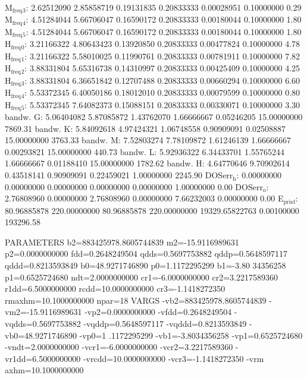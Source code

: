 \documentclass[11pt]{article}
\begin{document}
M\(_{\text{freq}}\)\(_{\text{3}}\):   2.62512090   2.85858719   0.19131835   0.20833333   0.00028951   0.10000000         0.29
M\(_{\text{freq}}\)\(_{\text{4}}\):   4.51284044   5.66706047   0.16590172   0.20833333   0.00180044   0.10000000         1.80
M\(_{\text{freq}}\)\(_{\text{5}}\):   4.51284044   5.66706047   0.16590172   0.20833333   0.00180044   0.10000000         1.80
H\(_{\text{freq}}\)\(_{\text{0}}\):   3.21166322   4.80643423   0.13920850   0.20833333   0.00477824   0.10000000         4.78
H\(_{\text{freq}}\)\(_{\text{1}}\):   3.21166322   5.58010025   0.11990761   0.20833333   0.00781911   0.10000000         7.82
H\(_{\text{freq}}\)\(_{\text{2}}\):   3.88331804   5.65316738   0.14310997   0.20833333   0.00425409   0.10000000         4.25
H\(_{\text{freq}}\)\(_{\text{3}}\):   3.88331804   6.36651842   0.12707488   0.20833333   0.00660294   0.10000000         6.60
H\(_{\text{freq}}\)\(_{\text{4}}\):   5.53372345   6.40050186   0.18012010   0.20833333   0.00079599   0.10000000         0.80
H\(_{\text{freq}}\)\(_{\text{5}}\):   5.53372345   7.64082373   0.15088151   0.20833333   0.00330071   0.10000000         3.30
bandw. G:   5.06404082   5.87085872   1.43762070   1.66666667   0.05246205  15.00000000      7869.31
bandw. K:   5.84092618   4.97424321   1.06748558   0.90909091   0.02508887  15.00000000      3763.33
bandw. M:   7.52803274   7.78109872   1.61246139   1.66666667   0.00293821  15.00000000       440.73
bandw. L:   5.92936322   6.34433701   1.55765244   1.66666667   0.01188410  15.00000000      1782.62
bandw. H:   4.64770646   9.70902614   0.43518141   0.90909091   0.22459021   1.00000000      2245.90
DOSerr\(_{\text{h}}\):   0.00000000   0.00000000   0.00000000   0.00000000   0.00000000   1.00000000         0.00
DOSerr\(_{\text{o}}\):   2.76808960   0.00000000   2.76808960   0.00000000   7.66232003   0.00000000         0.00
E\(_{\text{pris}}\)\(_{\text{f}}\):  80.96885878 220.00000000  80.96885878 220.00000000 19329.65822763   0.00100000    193296.58

PARAMETERS
  b2=883425978.8605744839 m2=-15.9116989631 p2=0.0000000000 fdd=0.2648249504 qdds=0.5697753882 qddp=0.5648597117 qddd=0.8213593849 b0=48.9271746890 p0=1.1172295299 b1=-3.80
34356258 p1=0.6525724680 ndt=2.0000000000 cr1=-6.0000000000 cr2=3.2217589360 r1dd=6.5000000000 rcdd=10.0000000000 cr3=-1.1418272350 rmaxhm=10.1000000000 npar=18 
VARGS
    -vb2=883425978.8605744839 -vm2=-15.9116989631 -vp2=0.0000000000 -vfdd=0.2648249504 -vqdds=0.5697753882 -vqddp=0.5648597117 -vqddd=0.8213593849 -vb0=48.9271746890 -vp0=1
.1172295299 -vb1=-3.8034356258 -vp1=0.6525724680 -vndt=2.0000000000 -vcr1=-6.0000000000 -vcr2=3.2217589360 -vr1dd=6.5000000000 -vrcdd=10.0000000000 -vcr3=-1.1418272350 -vrm
axhm=10.1000000000 
\end{document}
